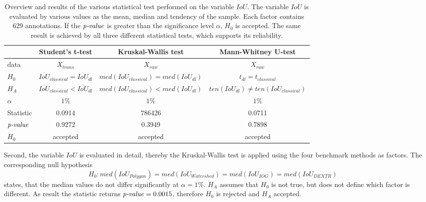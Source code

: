 \begin{table}[h!]
	\centering
	\begin{tabular}{l|c c c}
		\toprule 		
			 			& Student's t-test	& Kruskal-Wallis test 	& Mann-Whitney U-test \\
		\midrule
		data			& $X_{trans}$		& $X_{raw}$ 	 		& $X_{raw}$ 	\\ 
		$H_{0}$			& $\overline{IoU}_{classical} = \overline{IoU}_{dl}$ & $med \left( IoU_{classical} \right)  = med \left( IoU_{dl} \right)$ & $t_{dl} = t_{classical}$ 		\\
		$H_{A}$		 	& $\overline{IoU}_{classical} < \overline{IoU}_{dl}$ & $med \left( IoU_{classical} \right) < med \left( IoU_{dl} \right) $ & $ten \left( IoU_{dl} \right) \not= ten \left( IoU_{classical} \right) $ 	\\
		$\alpha$		& $1\%$ 			& $1\%$ 		 		& $1\%$ 		\\ 	
		Statistic		& 0.0914 			& 786426	     		& 0.0711    	\\ 
		$\textnormal{\textit{p-value}}$ 
						& 0.9272 			& 0.3949 		 		& 0.7898		\\ 
		$H_{0}$		  	& accepted 			& accepted		 		& accepted 		\\
		\bottomrule
	\end{tabular}
	\caption[Hypothesis Tests on $IoU$]{
		Overview and results of the various statistical test performed on the variable $IoU$.
		The variable $IoU$ is evaluated by various values as the mean, median and tendency of the sample.
		Each factor contains 629 annotations.
		If the $\textnormal{\textit{p-value}}$ is greater than the significance level $\alpha$, $H_{0}$ is accepted.
		The same result is achieved by all three different statistical tests, which supports its reliability.
	}\label{tab:ch5:tests_on_iou}
\end{table}

Second, the variable $IoU$ is evaluated in detail, thereby the Kruskal-Wallis test is applied using the four benchmark methods as factors.
The corresponding null hypothesis 
\begin{equation}
	H_{0}: med \left( IoU_{Polygon} \right) = med \left( IoU_{Watershed} \right) = med \left( IoU_{IOG} \right) = med \left( IoU_{DEXTR} \right)
\end{equation}
states, that the median values do not differ significantly at $\alpha=1\%$.
$H_{A}$ assumes that $H_{0}$ is not true, but does not define which factor is different.
As result the statistic returns $\textnormal{\textit{p-value}}=0.0015$, therefore $H_{0}$ is rejected and $H_{A}$ accepted.

